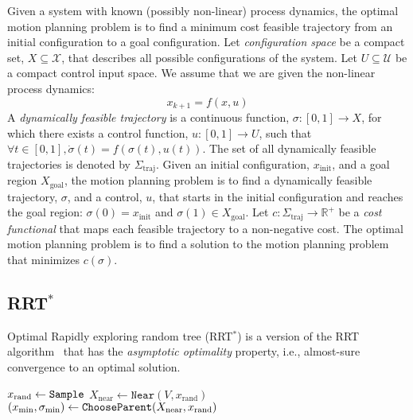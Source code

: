\documentclass[letterpaper, 10pt, english, conference]{IEEEtran}
\begin{document}
Given a system with known (possibly non-linear) process dynamics, the
optimal motion planning problem is to find a minimum cost feasible
trajectory from an initial configuration to a goal configuration. Let
{\em configuration space} be a compact set, $X \subseteq \mathcal{X}$,
that describes all possible configurations of the system. Let $U
\subseteq \mathcal{U}$ be a compact control input space. We assume that we
are given the non-linear process dynamics:
\[
x_{k+1} = f(x,u)
\]
A {\em dynamically feasible trajectory} is a continuous function,
$\sigma: [0,1] \to X$, for which there exists a control function,
$u:[0,1] \to U$, such that $\forall t \in [0,1], \dot{\sigma}(t) =
f(\sigma(t),u(t))$. The set of all dynamically feasible trajectories
is denoted by $\Sigma_\mathrm{traj}$. Given an initial configuration,
$x_\mathrm{init}$, and a goal region $X_\mathrm{goal}$, the motion
planning problem is to find a dynamically feasible trajectory,
$\sigma$, and a control, $u$, that starts in the initial configuration
and reaches the goal region: $\sigma(0) = x_\mathrm{init}$ and
$\sigma(1) \in X_\mathrm{goal}$. Let $c : \Sigma_\mathrm{traj} \to
\mathbb{R}^+$ be a {\em cost functional} that maps each feasible
trajectory to a non-negative cost. The optimal motion planning problem
is to find a solution to the motion planning problem that minimizes
$c(\sigma)$.

\subsection{RRT$^*$}

Optimal Rapidly exploring random tree (RRT$^*$) \cite{karaman.frazzoli.ijrr11} is a version of the RRT algorithm~\cite{lavalle.kuffner.ijrr01} that has the \emph{asymptotic optimality} property, i.e., almost-sure convergence to an optimal solution.

\begin{center}
\begin{algorithm}
 { \label{line:iteration_start_orig}
	$x_\mathrm{rand} \leftarrow {\tt Sample}$\; \label{line:rrtstar:sample}
	$X_\mathrm{near} \leftarrow \mathtt{Near}(V ,x_\mathrm{rand})$\; \label{line:rrtstar:compute_near_orig}
	$(x_\mathrm{min},\sigma_\mathrm{min}) \leftarrow {\tt ChooseParent}(X_\mathrm{near}, x_\mathrm{rand})$\; \label{line:rrtstar:call_find_min_cost_parent}
	}
\;
\caption{${\tt RRT}^* ((V,E), N)$}
\label{algorithm:rrtstar_orig}
\end{algorithm}
\end{center}
\end{document}
